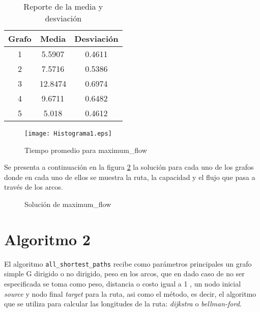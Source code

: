 \documentclass{article}
\begin{document}
\begin{table}[h]
\centering
\begin{tabular}{|c|c|c|}
\hline
\textbf{Grafo} & \textbf{Media} & \textbf{Desviación} \\ \hline
1              & 5.5907         & 0.4611              \\ \hline
2              & 7.5716         & 0.5386              \\ \hline
3              & 12.8474        & 0.6974              \\ \hline
4              & 9.6711         & 0.6482              \\ \hline
5              & 5.018          & 0.4612              \\ \hline
\end{tabular}
\caption{Reporte de la media y desviación} 
\label{Tabla1}
\end{table}

\begin{figure}[h]
\centering
\texttt{[image: Histograma1.eps]}  
\caption{Tiempo promedio para maximum\_flow}
\label{Figura1}
\end{figure}

Se presenta a continuación en la figura \ref{Grafos1} la solución para cada uno de los grafos donde en cada uno de ellos se muestra la ruta, la capacidad y el flujo que pasa a través de los arcos. 


\begin{figure}[H]
\centering
{}\hspace{5mm}
\vspace{5mm}
\hspace{5mm}
\vspace{5mm}
\caption{Solución de maximum\_flow} \label{Grafos1}
\end{figure}

\newpage
\section*{Algoritmo 2}
El algoritmo \texttt{all\_shortest\_paths} recibe como parámetros principales un grafo simple G dirigido o no dirigido, peso en los arcos, que en dado caso de no ser especificada se toma como peso, distancia o costo igual a 1 , un nodo inicial \textit{source} y nodo final \textit{target} para la ruta, asi como el método, es decir, el algoritmo que se utiliza para calcular las longitudes de la ruta: \textit{dijkstra} o \textit{bellman-ford}.
\end{document}
